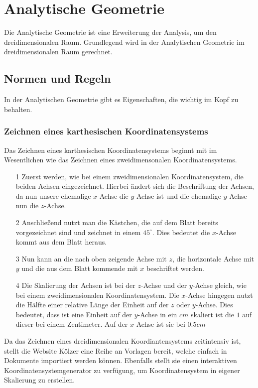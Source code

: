 \section{Analytische Geometrie}
Die Analytische Geometrie ist eine Erweiterung der Analysis, um den dreidimensionalen Raum. Grundlegend wird in der Analytischen Geometrie im dreidimensionalen Raum gerechnet.
\subsection{Normen und Regeln}
In der Analytischen Geometrie gibt es Eigenschaften, die wichtig im Kopf zu behalten. 
\subsubsection{Zeichnen eines karthesischen Koordinatensystems}
Das Zeichnen eines karthesischen Koordinatensystems beginnt mit im Wesentlichen wie das Zeichnen eines zweidimensonalen Koordinatensystems.
\begin{itemize}
\item[1] Zuerst werden, wie bei einem zweidimensionalen Koordinatensystem, die beiden Achsen eingezeichnet. Hierbei ändert sich die Beschriftung der Achsen, da nun unsere ehemalige $x$-Achse die $y$-Achse ist und die ehemalige $y$-Achse nun die $z$-Achse.
\item[2] Anschließend nutzt man die Kästchen, die auf dem Blatt bereits vorgezeichnet sind und zeichnet in einem $45^{\circ}$. Dies bedeutet die $x$-Achse kommt aus dem Blatt heraus. 
\item[3] Nun kann an die nach oben zeigende Achse mit $z$, die horizontale Achse mit $y$ und die aus dem Blatt kommende mit $x$ beschriftet werden. 
\item[4] Die Skalierung der Achsen ist bei der $z$-Achse und der $y$-Achse gleich, wie bei einem zweidimensionalen Koordinatensystem. Die $x$-Achse hingegen nutzt die Hälfte einer relative Länge der Einheit auf der $z$ oder $y$-Achse. Dies bedeutet, dass ist eine Einheit auf der $y$-Achse in ein $cm$ skaliert ist die $1$ auf dieser bei einem Zentimeter. Auf der $x$-Achse ist sie bei $0.5cm$
\end{itemize}
Da das Zeichnen eines dreidimensionalen Koordiantensystems zeitintensiv ist, stellt die Website Kölzer eine Reihe an Vorlagen bereit, welche einfach in Dokumente importiert werden können. Ebenfalls stellt sie einen interaktiven Koordinatensystemgenerator zu verfügung, um Koordinatensystem in eigener Skalierung zu erstellen.\\

